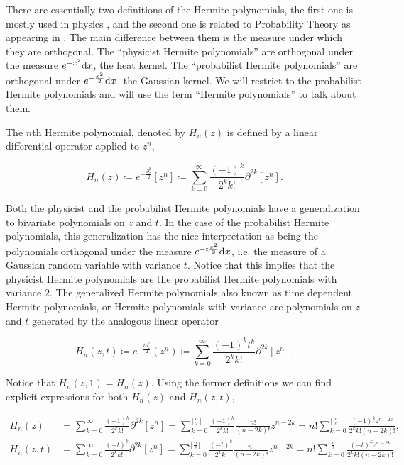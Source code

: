 There are essentially two definitions of the Hermite polynomials, the first one is mostly used in physics \cite{book:mathematical_methods_for_physicists}, and the second one is related to Probability Theory as appearing in \cite{marcus2021polynomial}. The main difference between them is the measure under which they are orthogonal. The ``physicist Hermite polynomials'' are orthogonal under the measure $e^{-x^2}\mathrm d x$, the heat kernel. The ``probabilist Hermite polynomials'' are orthogonal under $e^{-\frac{x^2}{2}} \mathrm d x$, the Gaussian kernel. We will restrict to the probabilist Hermite polynomials and will use the term ``Hermite polynomials'' to talk about them.

The $n$th Hermite polynomial, denoted by $H_n(z)$ is defined by a linear differential operator applied to $z^n$,

\begin{equation}
    H_n(z) \coloneqq e^{-\frac{\partial_z^2}{2}}[z^n] \coloneqq \sum_{k=0}^\infty \frac{(-1)^k}{2^k k!} \partial^{2k}[z^n].
\end{equation}

Both the physicist and the probabilist Hermite polynomials have a generalization to bivariate polynomials on $z$ and $t$. In the case of the probabilist Hermite polynomials, this generalization has the nice interpretation as being the polynomials orthogonal under the measure $e^{-t\frac{x^2}{2}}\mathrm d x$, i.e. the measure of a Gaussian random variable with variance $t$. Notice that this implies that the physicist Hermite polynomials are the probabilist Hermite polynomials with variance $2$. The generalized Hermite polynomials also known as time dependent Hermite polynomials, or Hermite polynomials with variance are polynomials on $z$ and $t$ generated by the analogous linear operator

\begin{equation}
    H_n(z,t) \coloneqq e^{-\frac{t\partial_z^2}{2}}(z^n) \coloneqq \sum_{k=0}^\infty \frac{(-1)^kt^k}{2^k k!} \partial^{2k}[z^n].
\end{equation}

Notice that $H_n(z,1)=H_n(z)$. Using the former definitions we can find explicit expressions for both $H_n(z)$ and $H_n(z,t)$,

\begin{align*}
    H_n(z) &= \sum_{k=0}^\infty \frac{(-1)^k}{2^k k!} \partial^{2k}[z^n] = \sum_{k=0}^{\lfloor \frac n2 \rfloor} \frac{(-1)^k}{2^k k!} \frac{n! }{(n-2k)!}z^{n-2k} = n! \sum_{k=0}^{\lfloor \frac n2\rfloor} \frac{(-1)^k z^{n-2k}}{2^k k! (n-2k)!}, \\
    H_n(z,t) &= \sum_{k=0}^\infty \frac{(-t)^k}{2^k k!} \partial^{2k}[z^n] = \sum_{k=0}^{\lfloor \frac n2 \rfloor} \frac{(-t)^k}{2^k k!} \frac{n! }{(n-2k)!}z^{n-2k} = n! \sum_{k=0}^{\lfloor \frac n2\rfloor} \frac{(-t)^k z^{n-2k}}{2^k k! (n-2k)!}.
\end{align*}

